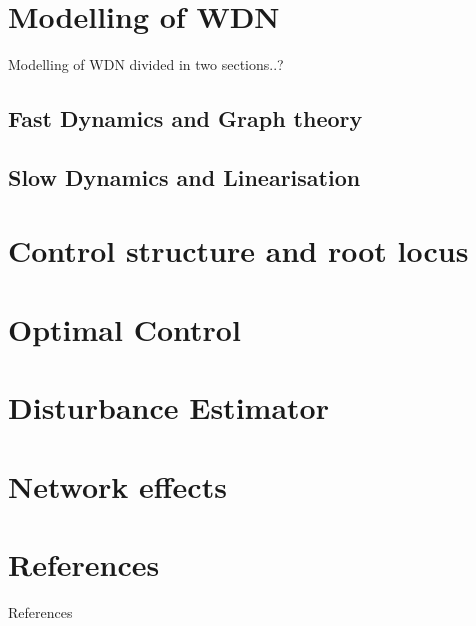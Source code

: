 \documentclass[10pt]{beamer}
\begin{document}

\section{Modelling of WDN}

\begin{frame}{Modelling of WDN}
	divided in two sections..?
\end{frame}
\subsection{Fast Dynamics and Graph theory}

%
\subsection{Slow Dynamics and Linearisation}

%
\section{Control structure and root locus}


\section{Optimal Control}


\section{Disturbance Estimator}

%
\section{Network effects}

%
%



















\section{References}
\begin{frame}{References}
	
	
\end{frame}

{\aauwavesbg
\begin{frame}
\end{frame}}
\end{document}
